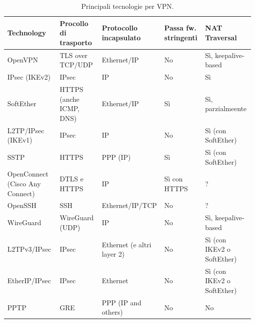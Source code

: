 \begin{table}
	\begin{tabular}{|p{3.3cm}|p{2.7cm}|p{3.1cm}|p{1.7cm}|p{3cm}|}
		\hline
		Technology                      & Procollo di trasporto   & Protocollo incapsulato     & Passa fw. stringenti & NAT Traversal               \\
		\hline
		OpenVPN                         & TLS over TCP/UDP        & Ethernet/IP                & No                   & Sì, keepalive-based        \\
		\hline
		IPsec (IKEv2)                   & IPsec                   & IP                         & No                   & Sì                         \\
		\hline
		SoftEther                       & HTTPS (anche ICMP, DNS) & Ethernet/IP                & Sì                  & Sì, parzialmeente          \\
		\hline
		L2TP/IPsec (IKEv1)              & IPsec                   & IP                         & No                   & Sì (con SoftEther)         \\
		\hline
		\hline
		SSTP                            & HTTPS                   & PPP (IP)                   & Sì                  & Sì (con SoftEther)         \\
		\hline
		OpenConnect (Cisco Any Connect) & DTLS e HTTPS            & IP                         & Sì con HTTPS        & ?                           \\
		\hline
		OpenSSH                         & SSH                     & Ethernet/IP/TCP            & No                   & ?                           \\
		\hline
		WireGuard                       & WireGuard (UDP)         & IP                         & No                   & Sì, keepalive-based        \\
		\hline
		L2TPv3/IPsec                    & IPsec                   & Ethernet (e altri layer 2) & No                   & Sì (con IKEv2 o SoftEther) \\
		\hline
		EtherIP/IPsec                   & IPsec                   & Ethernet                   & No                   & Sì (con IKEv2 o SoftEther) \\
		\hline
		PPTP                            & GRE                     & PPP (IP and others)        & No                   & No                          \\
		\hline
	\end{tabular}
	\caption[Tecnolgie per VPN. Con ``Protocollo di trasporto'' si intende
		quale è il protocollo di più alto livello in cui si incapsulano i pacchetti indicati
		dalla colonna ``Protocollo incapsulato''. Per ``fw stringenti'' si intendono firewall
	in grado di fare filtraggio al livello applicativo.]{Principali tecnologie per VPN.}
	\label{tbl:vpn-comparison}
\end{table}

